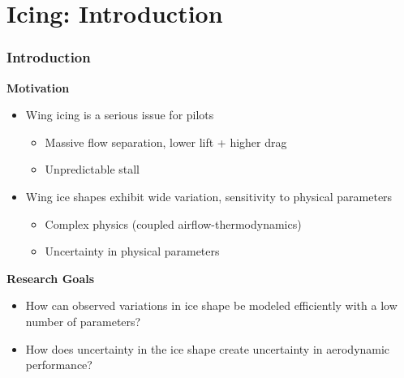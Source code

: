 \documentclass[9pt]{beamer}
\begin{document}
\section{Icing: Introduction}
\label{sec-1}
\begin{frame}
\frametitle{Introduction}
\label{sec-1-1}

\textbf{Motivation}
\begin{itemize}
\item Wing icing is a serious issue for pilots
\begin{itemize}
\item Massive flow separation, lower lift + higher drag
\item Unpredictable stall
\end{itemize}
\item Wing ice shapes exhibit wide variation, sensitivity to physical
  parameters
\begin{itemize}
\item Complex physics (coupled airflow-thermodynamics)
\item Uncertainty in physical parameters
\end{itemize}
\end{itemize}
\textbf{Research Goals}
\begin{itemize}
\item How can observed variations in ice shape be modeled
  efficiently with a low number of parameters?
\item How does uncertainty in the ice shape create uncertainty in
  aerodynamic performance?
\end{itemize}
\end{frame}
\end{document}
